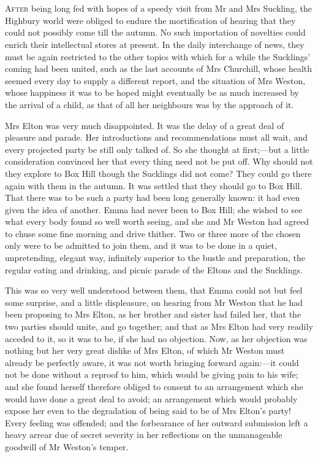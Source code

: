 \chapter[Chapter \thechapter]{}
\lettrine[lines=4,lraise=0.3]{A}{fter} being long fed with hopes of a speedy visit from Mr and Mrs Suckling, the Highbury world were obliged to endure the mortification of hearing that they could not possibly come till the autumn. No such importation of novelties could enrich their intellectual stores at present. In the daily interchange of news, they must be again restricted to the other topics with which for a while the Sucklings' coming had been united, such as the last accounts of Mrs Churchill, whose health seemed every day to supply a different report, and the situation of Mrs Weston, whose happiness it was to be hoped might eventually be as much increased by the arrival of a child, as that of all her neighbours was by the approach of it.

Mrs Elton was very much disappointed. It was the delay of a great deal of pleasure and parade. Her introductions and recommendations must all wait, and every projected party be still only talked of. So she thought at first;—but a little consideration convinced her that every thing need not be put off. Why should not they explore to Box Hill though the Sucklings did not come? They could go there again with them in the autumn. It was settled that they should go to Box Hill. That there was to be such a party had been long generally known: it had even given the idea of another. Emma had never been to Box Hill; she wished to see what every body found so well worth seeing, and she and Mr Weston had agreed to chuse some fine morning and drive thither. Two or three more of the chosen only were to be admitted to join them, and it was to be done in a quiet, unpretending, elegant way, infinitely superior to the bustle and preparation, the regular eating and drinking, and picnic parade of the Eltons and the Sucklings.

This was so very well understood between them, that Emma could not but feel some surprise, and a little displeasure, on hearing from Mr Weston that he had been proposing to Mrs Elton, as her brother and sister had failed her, that the two parties should unite, and go together; and that as Mrs Elton had very readily acceded to it, so it was to be, if she had no objection. Now, as her objection was nothing but her very great dislike of Mrs Elton, of which Mr Weston must already be perfectly aware, it was not worth bringing forward again:—it could not be done without a reproof to him, which would be giving pain to his wife; and she found herself therefore obliged to consent to an arrangement which she would have done a great deal to avoid; an arrangement which would probably expose her even to the degradation of being said to be of Mrs Elton's party! Every feeling was offended; and the forbearance of her outward submission left a heavy arrear due of secret severity in her reflections on the unmanageable goodwill of Mr Weston's temper.


